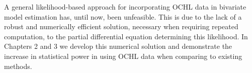 A general likelihood-based approach for incorporating OCHL data in
bivariate model estimation has, until now, been unfeasible. This is
due to the lack of a robust and numerically efficient solution,
necessary when requiring repeated computation, to the partial
differential equation determining this likelihood. In Chapters 2 and 3
we develop this numerical solution and demonstrate the increase in
statistical power in using OCHL data when comparing to existing
methods.
